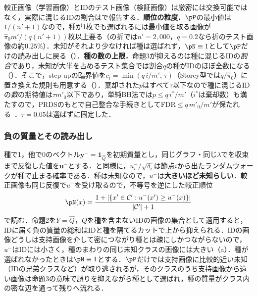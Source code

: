 較正画像（学習画像）とIDのテスト画像（検証画像）は厳密には交換可能ではなく，実際に混じるIDの割合はで報告する．\textbf{順位の粒度．}$\pP$の最小値は$1/(n'+1)$なので，種が1枚でも選ばれるには最小値を取る画像が$\hat{\pi}_0 m'/(q(n'+1))$枚以上要る（の折では$n'{=}2{,}000$，$q{=}0.2$なら折のテスト画像の約$0.25\%$）．未知がそれより少なければ種は選ばれず，$\pN\equiv1$として$\pP$だけの読み出しに戻る（）．\textbf{種の数の上限．}命題3が抑えるのは種に混じるIDの\textit{割合}であり，未知が大半を占めるテスト集合では割合$q$の種がIDのほぼ全数になる（）．そこで，step-upの臨界値を$c_i=\min(q\,i/m',\,\tau)$（Storey型では$q/\hat{\pi}_0$）に置き換えた規則も用意する（）．棄却された$p$はすべて$\tau$以下なので種に混じるIDの\textit{数}の期待値は$\tau m'_0$以下であり，単純BH法では$p\le q\,i^*/m'$（$i^*$は棄却数）も満たすので，PRDSのもとで自己整合な手続きとしてFDR$\le q\,m'_0/m'$が保たれる~\cite{blanchard2008two}．$\tau{=}0.05$は選ばずに固定した．

\subsubsection{負の質量とその読み出し}
種で1，他で0のベクトル$\mathbf{y}^{-}=\mathbf{1}_{\hat{Q}}$を初期質量とし，同じグラフ・同じ$\lambda$でを収束まで反復した値を$\mathbf{u}^{-}$とする．と同様に，$u^{-}_i/\sqrt{\delta_i}$は節点$i$から出たランダムウォークが種で止まる確率である．種は未知なので，$u^{-}$は\textbf{大きいほど未知らしい}．較正画像も同じ反復で$u^{-}$を受け取るので，不等号を逆にした較正順位
\begin{equation}
\pN(x)=\frac{1+|\{x'\in\mathcal{C}':u^{-}(x')\ge u^{-}(x)\}|}{|\mathcal{C}'|+1}
\label{eq:pneg}
\end{equation}
で読む．命題2を$Y=\hat{Q}$，$Q$を種を含まないIDの画像の集合として適用すると，IDに届く負の質量の総和はIDと種を隔てるカットで上から抑えられる．IDの画像どうしは支持画像を介して密につながり種とは疎にしかつながらないので，$u^{-}$はIDには小さく，種のまわりの同じ未知クラスの画像には大きい（a）．種が選ばれなかったときは$\pN\equiv1$とする．$\pP$だけでは支持画像に比較的近い未知（IDの兄弟クラスなど）が取り逃されるが，そのクラスのうち支持画像から遠い画像は命題3の意味で誤りを抑えながら種として選ばれ，種の質量がクラス内の密な辺を通って残りへ流れる．

